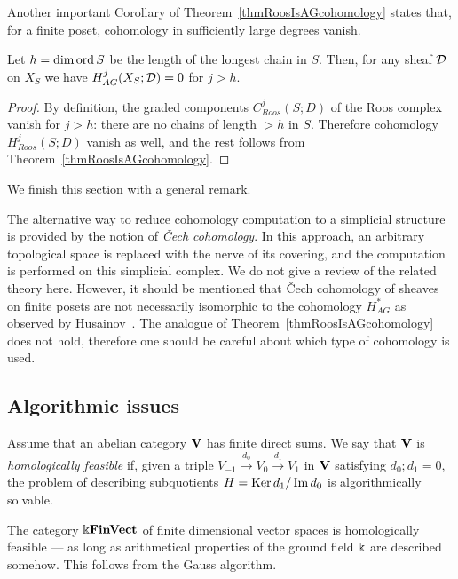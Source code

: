 Another important Corollary of Theorem~\ref{thmRoosIsAGcohomology} states that, for a finite poset, cohomology in sufficiently large degrees vanish.

\begin{cor}\label{corVanishing}
Let $h=\dim\operatorname{ord} S$ be the length of the longest chain in $S$. Then, for any sheaf $\mathcal{D}$ on $X_S$ we have $H^j_{AG}(X_S;\mathcal{D})=0$ for $j>h$.
\end{cor}

\begin{proof}
By definition, the graded components $C^j_{Roos}(S;D)$ of the Roos complex vanish for $j>h$: there are no chains of length $>h$ in $S$. Therefore cohomology $H^j_{Roos}(S;D)$ vanish as well, and the rest follows from Theorem~\ref{thmRoosIsAGcohomology}.
\end{proof}

We finish this section with a general remark.

\begin{rem}
The alternative way to reduce cohomology computation to a simplicial structure is provided by the notion of \emph{\v{C}ech cohomology}. In this approach, an arbitrary topological space is replaced with the nerve of its covering, and the computation is performed on this simplicial complex. We do not give a review of the related theory here. However, it should be mentioned that \v{C}ech cohomology of sheaves on finite posets are not necessarily isomorphic to the cohomology $H^*_{AG}$ as observed by Husainov~\cite[Sect.5.4]{Husainov}. The analogue of Theorem~\ref{thmRoosIsAGcohomology} does not hold, therefore one should be careful about which type of cohomology is used.
\end{rem}


\subsection{Algorithmic issues}\label{subsecMathFeasibility}

\begin{defin}\label{definHomologicallyFeasible}
Assume that an abelian category $\mathbf{V}$ has finite direct sums. We say that $\mathbf{V}$ is \emph{homologically feasible} if, given a triple $V_{-1}\stackrel{d_0}{\rightarrow}V_0\stackrel{d_1}{\rightarrow} V_1$ in $\mathbf{V}$ satisfying $d_0;d_1=0$, the problem of describing subquotients $H=\operatorname{Ker} d_1/\operatorname{Im} d_{0}$ is algorithmically solvable.
\end{defin}

\begin{ex}\label{exVectFeasible}
The category $\Bbbk\mathbf{FinVect}$ of finite dimensional vector spaces is homologically feasible --- as long as arithmetical properties of the ground field $\Bbbk$ are described somehow. This follows from the Gauss algorithm.
\end{ex}

